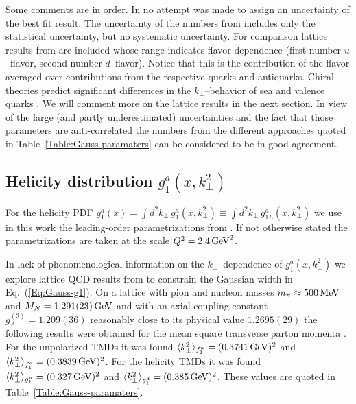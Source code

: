 \documentclass[a4paper,11pt]{article}
\newcommand{\la}{\langle}
\newcommand{\ra}{\rangle}
\def\kperp{k_\perp}
\def\avkperp{\la \kperp^2 \ra}
\begin{document}
Some comments are in order.
In \cite{Anselmino:2005nn} no attempt was made to assign an uncertainty of the
best fit result. The uncertainty of the numbers from \cite{Schweitzer:2010tt}
includes only the statistical uncertainty, but no systematic uncertainty.
For comparison lattice results from \cite{Hagler:2009mb} are included
whose range indicates flavor-dependence
(first number $u$--flavor,
second number $d$--flavor).
Notice that this is the contribution of the flavor averaged
over contributions from the respective quarks and antiquarks.
Chiral theories predict significant differences in the $\kperp$--behavior
of sea and valence quarks \cite{Schweitzer:2012hh}.
We will comment more on the lattice results in the next section.
In view of the large (and partly underestimated) uncertainties and the
fact that those parameters are anti-correlated the numbers from the
different approaches quoted in Table~\ref{Table:Gauss-paramaters}
can be considered to be in good agreement.

\subsection{\boldmath Helicity distribution $g_1^a(x,k_\perp^2)$}
\label{App:basis-g1}

For the helicity PDF $g_1^a(x)=\int d^2k_\perp\,g_1^a(x,k_\perp^2)\equiv
\int d^2k_\perp\,g_{1L}^a(x,k_\perp^2)$ we use in this work the leading-order
parametrizations from \cite{Gluck:1998xa}.
If not otherwise stated the parametrizations are taken at the scale
$Q^2=2.4\,{\rm GeV}^2$.

In lack of phenomenological information on the $k_\perp$--dependence of
$g_1^a(x,k_\perp^2)$ we explore lattice QCD results from \cite{Hagler:2009mb}
to constrain the Gaussian width in Eq.~(\ref{Eq:Gauss-g1}).
On a lattice with pion and nucleon masses
$m_\pi\approx 500\,{\rm MeV}$ and $M_N=1.291(23)\,{\rm GeV}$
and with an axial coupling constant $g_A^{(3)}= 1.209(36)$ reasonably
close to its physical value $1.2695(29)$ the following results were
obtained for the mean square transverse parton momenta \cite{Hagler:2009mb}.
For the unpolarized TMDs it was found
$\langle \kperp^2 \rangle_{f_1^u} = (0.3741\,{\rm GeV})^2$ and
$\langle \kperp^2 \rangle_{f_1^d} = (0.3839\,{\rm GeV})^2$.
For the helicity TMDs it was found
$\avkperp_{g_1^u} = (0.327\,{\rm GeV})^2$ and
$\avkperp_{g_1^d} = (0.385\,{\rm GeV})^2$.
These values are quoted in Table~\ref{Table:Gauss-paramaters}.
\end{document}
